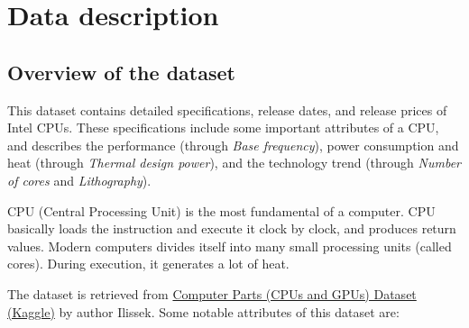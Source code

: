 %
%   
\section{Data description}









\subsection{Overview of the dataset}

This dataset contains detailed specifications, release dates, and release prices of Intel CPUs. These specifications include some important attributes of a CPU,
and describes the performance (through \textit{Base frequency}), power consumption and heat (through \textit{Thermal design power}), and the technology trend (through
\textit{Number of cores} and \textit{Lithography}).

CPU (Central Processing Unit) is the most fundamental of a computer. CPU basically loads the instruction and execute it clock by clock, and produces return values.
Modern computers divides itself into many small processing units (called cores). During execution, it generates a lot of heat.

The dataset is retrieved from \href{https://www.kaggle.com/datasets/iliassekkaf/computerparts?select=Intel_CPUs.csv}{Computer Parts (CPUs and GPUs) Dataset (Kaggle)} 
by author Ilissek. Some notable attributes of this dataset are:

